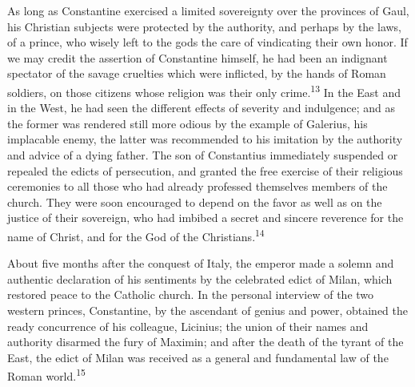 
As long as Constantine exercised a limited sovereignty over the
provinces of Gaul, his Christian subjects were protected by the
authority, and perhaps by the laws, of a prince, who wisely left to the
gods the care of vindicating their own honor. If we may credit the
assertion of Constantine himself, he had been an indignant spectator of
the savage cruelties which were inflicted, by the hands of Roman
soldiers, on those citizens whose religion was their only crime.\textsuperscript{13} In
the East and in the West, he had seen the different effects of severity
and indulgence; and as the former was rendered still more odious by the
example of Galerius, his implacable enemy, the latter was recommended
to his imitation by the authority and advice of a dying father. The son
of Constantius immediately suspended or repealed the edicts of
persecution, and granted the free exercise of their religious
ceremonies to all those who had already professed themselves members of
the church. They were soon encouraged to depend on the favor as well as
on the justice of their sovereign, who had imbibed a secret and sincere
reverence for the name of Christ, and for the God of the Christians.\textsuperscript{14}



About five months after the conquest of Italy, the emperor made a
solemn and authentic declaration of his sentiments by the celebrated
edict of Milan, which restored peace to the Catholic church. In the
personal interview of the two western princes, Constantine, by the
ascendant of genius and power, obtained the ready concurrence of his
colleague, Licinius; the union of their names and authority disarmed
the fury of Maximin; and after the death of the tyrant of the East, the
edict of Milan was received as a general and fundamental law of the
Roman world.\textsuperscript{15}


